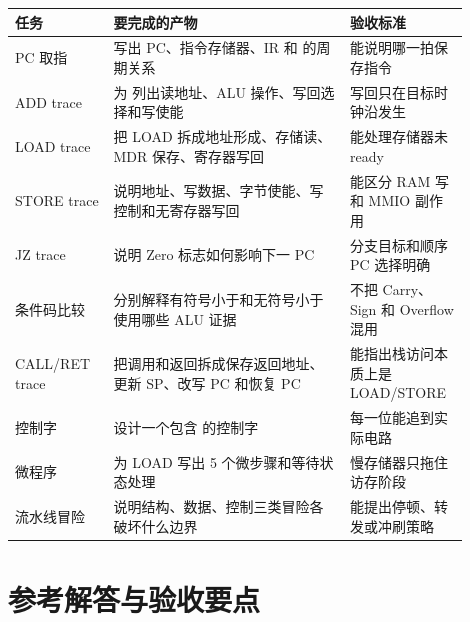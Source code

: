 \begin{longtable}{L{0.2\linewidth}L{0.48\linewidth}L{0.22\linewidth}}
\toprule
任务 & 要完成的产物 & 验收标准 \\
\midrule
PC 取指 & 写出 PC、指令存储器、IR 和  的周期关系 & 能说明哪一拍保存指令 \\
ADD trace & 为  列出读地址、ALU 操作、写回选择和写使能 & 写回只在目标时钟沿发生 \\
LOAD trace & 把 LOAD 拆成地址形成、存储读、MDR 保存、寄存器写回 & 能处理存储器未 ready \\
STORE trace & 说明地址、写数据、字节使能、写控制和无寄存器写回 & 能区分 RAM 写和 MMIO 副作用 \\
JZ trace & 说明 Zero 标志如何影响下一 PC & 分支目标和顺序 PC 选择明确 \\
条件码比较 & 分别解释有符号小于和无符号小于使用哪些 ALU 证据 & 不把 Carry、Sign 和 Overflow 混用 \\
CALL/RET trace & 把调用和返回拆成保存返回地址、更新 SP、改写 PC 和恢复 PC & 能指出栈访问本质上是 LOAD/STORE \\
控制字 & 设计一个包含  的控制字 & 每一位能追到实际电路 \\
微程序 & 为 LOAD 写出 5 个微步骤和等待状态处理 & 慢存储器只拖住访存阶段 \\
流水线冒险 & 说明结构、数据、控制三类冒险各破坏什么边界 & 能提出停顿、转发或冲刷策略 \\
\bottomrule
\end{longtable}

\section*{参考解答与验收要点}

